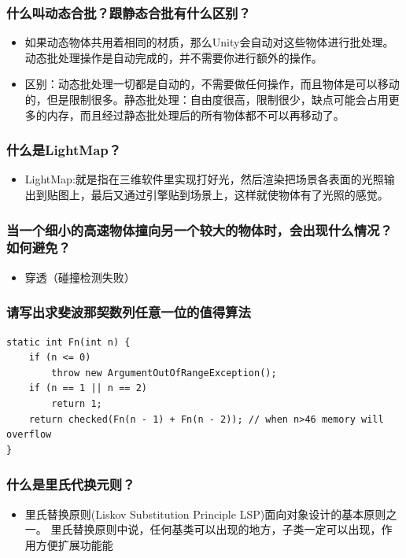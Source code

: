 \documentclass[9pt, b5paper]{article}
\begin{document}
\subsubsection{什么叫动态合批？跟静态合批有什么区别？}
\label{sec:orge3680ee}
\begin{itemize}
\item 如果动态物体共用着相同的材质，那么Unity会自动对这些物体进行批处理。动态批处理操作是自动完成的，并不需要你进行额外的操作。
\item 区别：动态批处理一切都是自动的，不需要做任何操作，而且物体是可以移动的，但是限制很多。静态批处理：自由度很高，限制很少，缺点可能会占用更多的内存，而且经过静态批处理后的所有物体都不可以再移动了。
\end{itemize}
\subsubsection{什么是LightMap？}
\label{sec:org778cc93}
\begin{itemize}
\item LightMap:就是指在三维软件里实现打好光，然后渲染把场景各表面的光照输出到贴图上，最后又通过引擎贴到场景上，这样就使物体有了光照的感觉。
\end{itemize}
\subsubsection{当一个细小的高速物体撞向另一个较大的物体时，会出现什么情况？如何避免？}
\label{sec:orgf8805b7}
\begin{itemize}
\item 穿透（碰撞检测失败）
\end{itemize}
\subsubsection{请写出求斐波那契数列任意一位的值得算法}
\label{sec:orgf05dc34}
\begin{verbatim}
static int Fn(int n) {
    if (n <= 0) 
        throw new ArgumentOutOfRangeException();
    if (n == 1 || n == 2) 
        return 1;
    return checked(Fn(n - 1) + Fn(n - 2)); // when n>46 memory will  overflow
}
\end{verbatim}
\subsubsection{什么是里氏代换元则？}
\label{sec:orgb6ce831}
\begin{itemize}
\item 里氏替换原则(Liskov Substitution Principle LSP)面向对象设计的基本原则之一。 里氏替换原则中说，任何基类可以出现的地方，子类一定可以出现，作用方便扩展功能能
\end{itemize}
\end{document}
